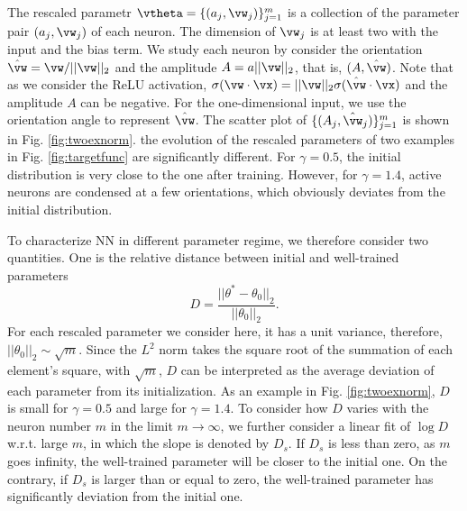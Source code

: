 \documentclass{article}
\begin{document}
The rescaled parametr $\vtheta=\{(a_j,\vw_j)\}_{j=1}^{m}$ is a collection of the parameter pair $(a_j,\vw_j)$ of each neuron. The dimension of  $\vw_j$ is at least two with the input and the bias term. We study each neuron by consider the orientation $\hat{\vw}=\vw/||\vw||_{2}$ and the amplitude $A=a||\vw||_{2}$, that is, $(A,\hat{\vw})$.  Note that as we consider the ReLU activation, $\sigma(\vw\cdot\vx)=||\vw||_{2}\sigma(\hat{\vw}\cdot\vx)$ and the amplitude $A$ can be negative.  For the one-dimensional input, we use the orientation angle to represent $\hat{\vw}$. The scatter plot of $\{(A_j,\hat{\vw}_j)\}_{j=1}^{m}$ is shown in Fig. \ref{fig:twoexnorm}. the evolution of the  rescaled parameters of two examples in Fig. \ref{fig:targetfunc} are significantly different. For $\gamma=0.5$, the initial distribution is very close to the one after training. However, for $\gamma=1.4$, active neurons are condensed at a few orientations, which obviously deviates from the initial distribution.

To characterize NN in different parameter regime, we therefore consider two quantities. One is the  relative distance between initial and well-trained parameters
\begin{equation}
    D=\frac{||\theta^{*}-\theta_{0}||_{2}}{||\theta_{0}||_{2}}.
\end{equation}
For each rescaled parameter we consider here, it has a unit variance, therefore, $||\theta_{0}||_{2}\sim \sqrt{m}$. Since the $L^2$ norm takes the square root of the summation of each element's square, with $\sqrt{m}$, $D$ can be interpreted as the average deviation of each parameter from its initialization. As an example in Fig. \ref{fig:twoexnorm}, $D$ is small for $\gamma=0.5$ and large for $\gamma=1.4$. To consider how $D$ varies with the neuron number $m$ in the limit $m\rightarrow \infty$, we further consider a linear fit of $\log D$ w.r.t. large $m$, in which the slope is denoted by $D_{s}$. If $D_{s}$ is less than zero, as $m$ goes infinity, the well-trained parameter will be closer to the initial one. On the contrary, if $D_{s}$ is larger than or equal to zero, the well-trained parameter has significantly deviation from the initial one.
\end{document}
